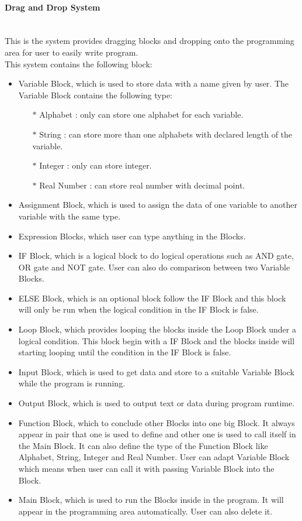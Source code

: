 
\paragraph{Drag and Drop System}~{}
\\
This is the system provides dragging blocks and dropping onto the programming area for user to easily write program.\\
This system contains the following block:
  \begin{itemize}
	\item Variable Block, which is used to store data with a name given by user. The Variable Block contains the following type:
		\begin{itemize}
		\item[$\ast$] Alphabet : only can store one alphabet for each variable.
		\item[$\ast$] String : can store more than one alphabets with declared length of the variable.
		\item[$\ast$] Integer : only can store integer.
		\item[$\ast$] Real Number : can store real number with decimal point.
    \end{itemize}
	\item Assignment Block, which is used to assign the data of one variable to another variable with the same type.
	\item Expression Blocks, which user can type anything in the Blocks.
	\item IF Block, which is a logical block to do logical operations such as AND gate, OR gate and NOT gate. User can also do comparison between two Variable Blocks.
	\item ELSE Block, which is an optional block follow the IF Block and this block will only be run when the logical condition in the IF Block is false.
	\item Loop Block, which provides looping the blocks inside the Loop Block under a logical condition. This block begin with a IF Block and the blocks inside will starting looping until the condition in the IF Block is false.
	\item Input Block, which is used to get data and store to a suitable Variable Block while the program is running.
	\item Output Block, which is used to output text or data during program runtime.
	\item Function Block, which to conclude other Blocks into one big Block. It always appear in pair that one is used to define and other one is used to call itself in the Main Block. It can also define the type of the Function Block like Alphabet, String, Integer and Real Number. User can adapt Variable Block which means when user can call it with passing Variable Block into the Block.
	\item Main Block, which is used to run the Blocks inside in the program. It will appear in the programming area automatically. User can also delete it.
	\end{itemize}





